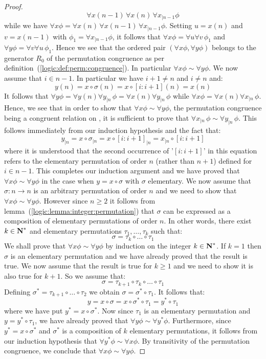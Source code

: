 \begin{proof}
\[    \forall x(n-1)\,\forall x(n)\,
    \forall x_{|n-1}\phi
    \]
while we have $\forall x\phi=\forall x(n)\,\forall x(n-1)\, \forall
x_{|n-1}\phi$. Setting $u=x(n)$ and $v=x(n-1)$ with
$\phi_{1}=\forall x_{|n-1}\phi$, it follows that $\forall x\phi =
\forall u\forall v\,\phi_{1}$ and $\forall y\phi=\forall v\forall
u\,\phi_{1}$. Hence we see that the ordered pair $(\forall
x\phi,\forall y\phi)$ belongs to the generator $R_{0}$ of the
permutation congruence as per
definition~(\ref{logic:def:perm:congruence}). In particular $\forall
x\phi\sim\forall y\phi$. We now assume that $i\in n-1$. In
particular we have $i+1\neq n$ and $i\neq n$ and:
    \[
    y(n)=x\circ\sigma(n)=x\circ[i:i+1](n)=x(n)
    \]
It follows that $\forall y\phi=\forall y(n)\forall
y_{|n}\,\phi=\forall x(n)\forall y_{|n}\,\phi$ while $\forall
x\phi=\forall x(n)\forall x_{|n}\,\phi$. Hence, we see that in order
to show that $\forall x\phi\sim\forall y\phi$, the permutation
congruence being a congruent relation on \pv, it is sufficient to
prove that $\forall x_{|n}\,\phi\sim\forall y_{|n}\,\phi$. This
follows immediately from our induction hypothesis and the fact that:
    \[
    y_{|n}=x\circ\sigma_{|n}=x\circ [i:i+1]_{|n}=x_{|n}\circ [i:i+1]
    \]
where it is understood that the second occurrence of '$[i:i+1]$' in
this equation refers to the elementary permutation of order $n$
(rather than $n+1$) defined for $i\in n-1$. This completes our
induction argument and we have proved that $\forall x\phi\sim\forall
y\phi$ in the case when $y=x\circ\sigma$ with $\sigma$ elementary.
We now assume that $\sigma:n\to n$ is an arbitrary permutation of
order $n$ and we need to show that $\forall x\phi\sim\forall y\phi$.
However since $n\geq 2$ it follows from
lemma~(\ref{logic:lemma:integer:permutation}) that $\sigma$ can be
expressed as a composition of elementary permutations of order $n$.
In other words, there exist $k\in\mbox{$\bf N$}^{*}$ and elementary permutations
$\tau_{1}, \ldots, \tau_{k}$ such that:
    \[
    \sigma=\tau_{k}\circ\ldots\circ\tau_{1}
    \]
We shall prove that $\forall x\phi\sim\forall y\phi$ by induction on
the integer $k\in\mbox{$\bf N$}^{*}$. If $k=1$ then $\sigma$ is an elementary
permutation and we have already proved that the result is true. We
now assume that the result is true for $k\geq 1$ and we need to show
it is also true for $k+1$. So we assume that:
    \[
    \sigma=\tau_{k+1}\circ\tau_{k}\circ\ldots\circ\tau_{1}
    \]
Defining $\sigma^{*}=\tau_{k+1}\circ\ldots\circ\tau_{2}$ we obtain
$\sigma=\sigma^{*}\circ\tau_{1}$. It follows that:
    \[
    y=x\circ\sigma=x\circ\sigma^{*}\circ\tau_{1}=y^{*}\circ\tau_{1}
    \]
where we have put $y^{*}=x\circ\sigma^{*}$. Now since $\tau_{1}$ is
an elementary permutation and $y=y^{*}\circ\tau_{1}$, we have
already proved that $\forall y\phi\sim\forall y^{*}\phi$.
Furthermore, since $y^{*}=x\circ\sigma^{*}$ and $\sigma^{*}$ is a
composition of $k$ elementary permutations, it follows from our
induction hypothesis that $\forall y^{*}\phi\sim\forall x\phi$. By
transitivity of the permutation congruence, we conclude that
$\forall x\phi\sim\forall y\phi$.
\end{proof}
